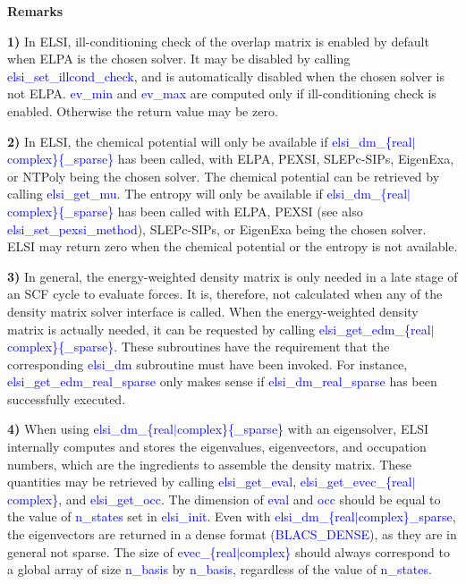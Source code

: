 \documentclass{report}
\newcommand{\tcb}[1]{\textcolor{blue}{#1}}
\begin{document}
\textbf{Remarks}

\textbf{1)} In ELSI, ill-conditioning check of the overlap matrix is enabled by default when ELPA is the chosen solver. It may be disabled by calling \tcb{elsi\_set\_illcond\_check}, and is automatically disabled when the chosen solver is not ELPA. \tcb{ev\_min} and \tcb{ev\_max} are computed only if ill-conditioning check is enabled. Otherwise the return value may be zero.

\textbf{2)} In ELSI, the chemical potential will only be available if \tcb{elsi\_dm\_\{real$\vert$complex\}\{\_sparse\}} has been called, with ELPA, PEXSI, SLEPc-SIPs, EigenExa, or NTPoly being the chosen solver. The chemical potential can be retrieved by calling \tcb{elsi\_get\_mu}. The entropy will only be available if \tcb{elsi\_dm\_\{real$\vert$complex\}\{\_sparse\}} has been called with ELPA, PEXSI (see also \tcb{elsi\_set\_pexsi\_method}), SLEPc-SIPs, or EigenExa being the chosen solver. ELSI may return zero when the chemical potential or the entropy is not available.

\textbf{3)} In general, the energy-weighted density matrix is only needed in a late stage of an SCF cycle to evaluate forces. It is, therefore, not calculated when any of the density matrix solver interface is called. When the energy-weighted density matrix is actually needed, it can be requested by calling \tcb{elsi\_get\_edm\_\{real$\vert$complex\}\{\_sparse\}}. These subroutines have the requirement that the corresponding \tcb{elsi\_dm} subroutine must have been invoked. For instance, \tcb{elsi\_get\_edm\_real\_sparse} only makes sense if \tcb{elsi\_dm\_real\_sparse} has been successfully executed.

\textbf{4)} When using \tcb{elsi\_dm\_\{real$\vert$complex\}\{\_sparse\}} with an eigensolver, ELSI internally computes and stores the eigenvalues, eigenvectors, and occupation numbers, which are the ingredients to assemble the density matrix. These quantities may be retrieved by calling \tcb{elsi\_get\_eval}, \tcb{elsi\_get\_evec\_\{real$\vert$complex\}}, and \tcb{elsi\_get\_occ}. The dimension of \tcb{eval} and \tcb{occ} should be equal to the value of \tcb{n\_states} set in \tcb{elsi\_init}. Even with \tcb{elsi\_dm\_\{real$\vert$complex\}\_sparse}, the eigenvectors are returned in a dense format (\tcb{BLACS\_DENSE}), as they are in general not sparse. The size of \tcb{evec\_\{real$\vert$complex\}} should always correspond to a global array of size \tcb{n\_basis} by \tcb{n\_basis}, regardless of the value of \tcb{n\_states}.
\end{document}
